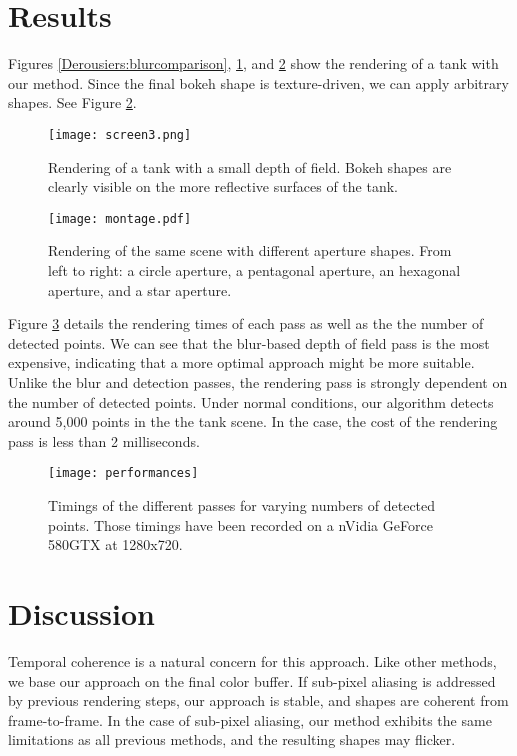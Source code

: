 \section{Results}
Figures \ref{Derousiers:blurcomparison}, \ref{Derousiers:bokehrendering}, and \ref{Derousiers:bokehcomparison} show the rendering of a tank with our method. Since the final bokeh shape is texture-driven, we can apply arbitrary shapes. See Figure \ref{Derousiers:bokehcomparison}.

	\begin{figure}[htb]\centering
	\texttt{[image: screen3.png]}
	\caption{Rendering of a tank with a small depth of field. Bokeh shapes are clearly visible on the more reflective surfaces of the tank.}
	\label{Derousiers:bokehrendering}
	\end{figure}

	\begin{figure}[htb]\centering
	\texttt{[image: montage.pdf]}
	\caption{Rendering of the same scene with different aperture shapes. From left to right: a circle aperture, a pentagonal aperture, an hexagonal aperture, and a star aperture.}
	\label{Derousiers:bokehcomparison}
	\end{figure}

Figure \ref{Derousiers:performance} details the rendering times of each pass as well as the the number of detected \bokeh points. We can see that the blur-based depth of field pass is the most expensive, indicating that a more optimal approach might be more suitable. Unlike the blur and detection passes, the rendering pass is strongly dependent on the number of detected \bokeh points. Under normal conditions, our algorithm detects around 5,000 \bokeh points in the the tank scene. In the case, the cost of the rendering pass is less than 2 milliseconds.

	\begin{figure}[htb]\centering
	\texttt{[image: performances]}
	\caption{Timings of the different passes for varying numbers of detected \bokeh points. Those timings have been recorded on a nVidia GeForce 580GTX at 1280x720. }
	\label{Derousiers:performance}
	\end{figure}

\section{Discussion}
Temporal coherence is a natural concern for this approach. Like other methods, we base our approach on the final color buffer. If sub-pixel aliasing is addressed by previous rendering steps, our approach is stable, and \bokeh shapes are coherent from frame-to-frame. In the case of sub-pixel aliasing, our method exhibits the same limitations as all previous methods, and the resulting \bokeh shapes may flicker.

